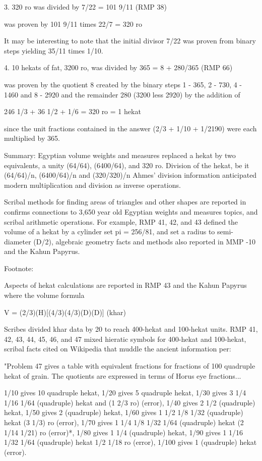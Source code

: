 \documentclass[12pt]{article}
\begin{document}
3. 320 ro was divided by 7/22 = 101 9/11 (RMP 38)

was proven by 101 9/11 times 22/7 = 320 ro

It may be interesting to note that the initial divisor 7/22 was proven from binary steps yielding 35/11 times 1/10.

4. 10 hekats of fat, 3200 ro, was divided by 365 = 8 + 280/365  (RMP 66)

was proven by the quotient 8 created by the binary steps 1 - 365, 2 - 730, 4 - 1460 and 8 - 2920
and the remainder 280 (3200 less 2920) by the addition of 

246 1/3 + 36 1/2 +  1/6 = 320 ro = 1 hekat 

since the unit fractions contained in the answer (2/3 + 1/10 + 1/2190) were each multiplied by 365.

Summary: Egyptian volume weights and measures replaced a hekat by two equivalents, a unity (64/64), (6400/64), and  320 ro. Division of the hekat, be it (64/64)/n, (6400/64)/n  and (320/320)/n  Ahmes' division information anticipated modern multiplication and division as inverse operations. 

Scribal methods for finding areas of triangles and other shapes are reported in  confirms connections to 3,650 year old Egyptian weights and measures topics, and scribal arithmetic operations. For example, RMP 41, 42, and 43 defined the volume of a hekat by a cylinder set pi = 256/81, and set a radius to semi-diameter (D/2), algebraic geometry facts and methods also reported in MMP -10 and the Kahun Papyrus. 

Footnote:

Aspects of hekat calculations are reported in RMP 43 and the Kahun Papyrus where the volume formula

V = (2/3)(H)[(4/3)(4/3)(D)(D)] (khar) 

Scribes divided khar data by 20 to reach 400-hekat and 100-hekat units. RMP 41, 42, 43, 44, 45, 46, and 47 mixed hieratic symbols for 400-hekat and 100-hekat, scribal facts cited on Wikipedia that muddle the ancient information per:

"Problem 47 gives a table with equivalent fractions for fractions of 100 quadruple hekat of grain. The quotients are expressed in terms of Horus eye fractions...

1/10 gives 10 quadruple hekat,
1/20 gives 5 quadruple hekat,
1/30 gives 3 1/4 1/16 1/64 (quadruple) hekat and (1 2/3 ro) (error),
1/40 gives 2 1/2 (quadruple) hekat,
1/50 gives 2 (quadruple) hekat,
1/60 gives 1 1/2 1/8 1/32 (quadruple) hekat (3 1/3) ro  (error),
1/70 gives 1 1/4 1/8 1/32 1/64 (quadruple) hekat (2 1/14 1/21) ro (error)*,
1/80 gives 1 1/4 (quadruple) hekat,  
1/90 gives 1 1/16 1/32 1/64 (quadruple) hekat 1/2 1/18 ro (error),
1/100 gives 1 (quadruple) hekat (error).
\end{document}

